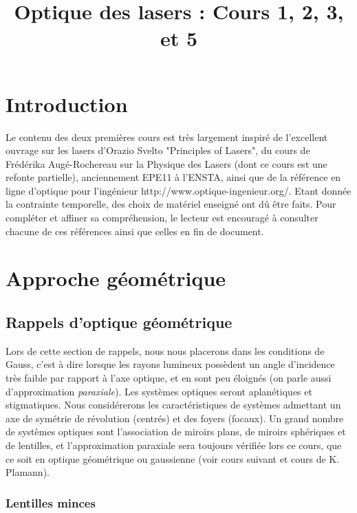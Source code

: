 \documentclass[a4paper]{book}
\title{Optique des lasers : Cours 1, 2, 3, et 5}
\author{}
\date{}
\begin{document}
\maketitle

\chapter*{Introduction}

Le contenu des deux premières  cours est très largement inspiré de l'excellent ouvrage sur les lasers d'Orazio Svelto "Principles of Lasers", du cours de Frédérika Augé-Rochereau sur la Physique des Lasers (dont ce cours est une refonte partielle), anciennement EPE11 à l'ENSTA, ainsi que de la référence en ligne d'optique pour l'ingénieur http://www.optique-ingenieur.org/. Etant donnée la contrainte temporelle, des choix de matériel enseigné ont dû être faits. Pour compléter et affiner sa compréhension, le lecteur est encouragé à consulter chacune de ces références ainsi que celles en fin de document.


\chapter{Approche géométrique}

\section{Rappels d'optique géométrique}
Lors de cette section de rappels, nous nous placerons dans les conditions de Gauss, c'est à dire lorsque les rayons lumineux possèdent un angle d'incidence très faible par rapport à l'axe optique, et en sont peu éloignés (on parle aussi d'approximation \textit{paraxiale}). Les systèmes optiques seront aplanétiques et stigmatiques. Nous considérerons les caractéristiques de systèmes admettant un axe de symétrie de révolution (centrés) et des foyers (focaux). Un grand nombre de systèmes optiques sont l’association de miroirs plans, de miroirs sphériques et de lentilles, et l'approximation paraxiale sera toujours vérifiée lors ce cours, que ce soit en optique géométrique ou gaussienne (voir cours suivant et cours de K. Plamann). 

\subsection{Lentilles minces}
\end{document}
